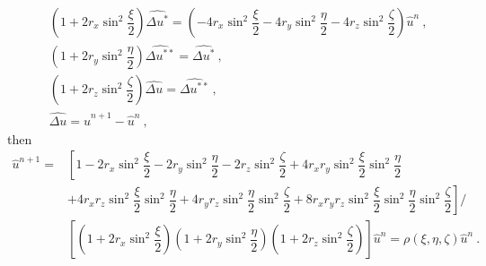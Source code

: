 \documentclass[12pt,a4paper]{article}
\begin{document}
\begin{align}
& \left(1+2 r_x \sin^2 \dfrac{\xi}{2} \right) \widehat{\Delta u^\ast} = \left(-4r_x \sin^2 \dfrac{\xi}{2} -4r_y \sin^2 \dfrac{\eta}{2} -4r_z   \sin^2 \dfrac{\zeta}{2} \right) \hat{u}^{n}  ~, \\
& \left(1+2 r_y \sin^2 \dfrac{\eta}{2} \right) \widehat{\Delta u^{\ast\ast}} = \widehat{\Delta u^\ast} ~, \\
& \left(1+2 r_z \sin^2 \dfrac{\zeta}{2}  \right) \widehat{\Delta u} =  \widehat{\Delta u^{\ast\ast} } ~, \\
&  \widehat{\Delta u} =  \widehat{u}^{n+1} - \widehat{u}^{n} ~,
\end{align}
then
\begin{align}
\nonumber  \widehat{u}^{n+1} = & \left[1 -2 r_x \sin^2 \dfrac{\xi}{2} -2 r_y \sin^2 \dfrac{\eta}{2} -2 r_z \sin^2 \dfrac{\zeta}{2} +4r_x r_y \sin^2 \dfrac{\xi}{2} \sin^2 \dfrac{\eta}{2} \right. \\
\nonumber  & \left. +4r_x r_z \sin^2 \dfrac{\xi}{2} \sin^2 \dfrac{\eta}{2} + 4r_y r_z \sin^2 \dfrac{\eta}{2} \sin^2 \dfrac{\zeta}{2} +8 r_xr_yr_z \sin^2 \dfrac{\xi}{2} \sin^2 \dfrac{\eta}{2} \sin^2 \dfrac{\zeta}{2} \right] / \\
& \left[\left(1+2 r_x \sin^2 \dfrac{\xi}{2} \right) \left(1+2 r_y \sin^2 \dfrac{\eta}{2} \right) \left(1+2 r_z \sin^2 \dfrac{\zeta}{2} \right) \right] \widehat{u}^{n} = \rho(\xi, \eta, \zeta) \widehat{u}^{n} ~.
\end{align}
\end{document}
